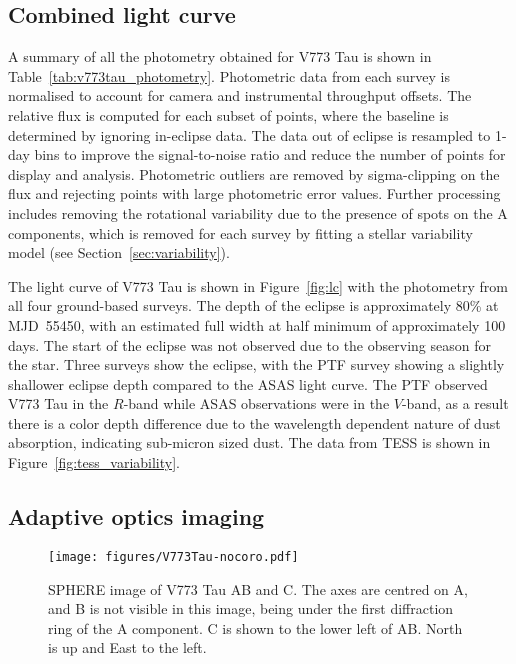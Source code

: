 \documentclass{aa}
\begin{document}
\subsection{Combined light curve}

A summary of all the photometry obtained for V773 Tau is shown in Table~\ref{tab:v773tau_photometry}.
%
Photometric data from each survey is normalised to account for camera and instrumental throughput offsets.
%
The relative flux is computed for each subset of points, where the baseline is determined by ignoring in-eclipse data.
%
The data out of eclipse is resampled to 1-day bins to improve the signal-to-noise ratio and reduce the number of points for display and analysis.
%
Photometric outliers are removed by sigma-clipping on the flux and rejecting points with large photometric error values.
%
Further processing includes removing the rotational variability due to the presence of spots on the A components, which is removed for each survey by fitting a stellar variability model (see Section~\ref{sec:variability}). 

The light curve of V773 Tau is shown in Figure~\ref{fig:lc} with the photometry from all four ground-based surveys.
%
The depth of the eclipse is approximately 80\% at MJD~55450, with an estimated full width at half minimum of approximately 100 days. 
%
The start of the eclipse was not observed due to the observing season for the star.
%
Three surveys show the eclipse, with the PTF survey showing a slightly shallower eclipse depth compared to the ASAS light curve.
%
The PTF observed V773 Tau in the $R$-band while ASAS observations were in the $V$-band, as a result there is a color depth difference due to the wavelength dependent nature of dust absorption, indicating sub-micron sized dust.
%
The data from TESS is shown in Figure~\ref{fig:tess_variability}.

\subsection{Adaptive optics imaging}\label{sec:di}

\begin{figure}[ht]
    \centering
    \texttt{[image: figures/V773Tau-nocoro.pdf]}
    \caption{SPHERE image of V773 Tau AB and C. The axes are centred on A, and B is not visible in this image, being under the first diffraction ring of the A component.
    C is shown to the lower left of AB.
    North is up and East to the left.}
    \label{fig:sphere}
\end{figure}
\end{document}

